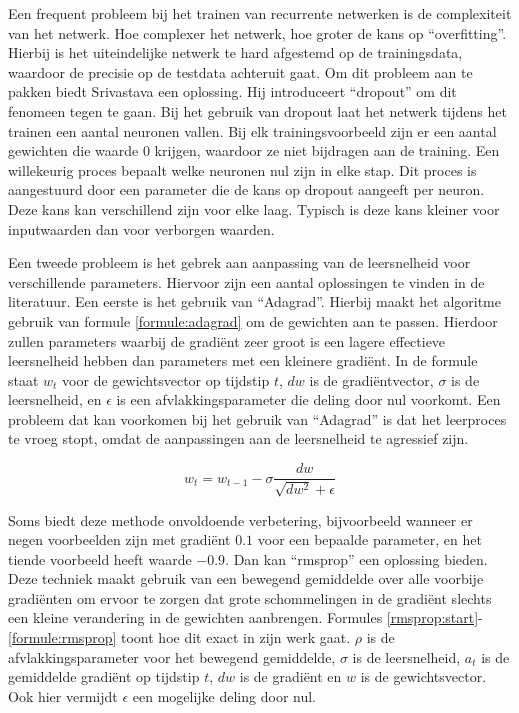 Een frequent probleem bij het trainen van recurrente netwerken is de complexiteit van het netwerk. Hoe complexer het netwerk, hoe groter de kans op ``overfitting''. Hierbij is het uiteindelijke netwerk te hard afgestemd op de trainingsdata, waardoor de precisie op de testdata achteruit gaat. Om dit probleem aan te pakken biedt Srivastava\cite{Srivastava2013} een oplossing. Hij introduceert ``dropout'' om dit fenomeen tegen te gaan. Bij het gebruik van dropout laat het netwerk tijdens het trainen een aantal neuronen vallen. Bij elk trainingsvoorbeeld zijn er een aantal gewichten die waarde 0 krijgen, waardoor ze niet bijdragen aan de training. Een willekeurig proces bepaalt welke neuronen nul zijn in elke stap. Dit proces is aangestuurd door een parameter die de kans op dropout aangeeft per neuron. Deze  kans kan verschillend zijn voor elke laag. Typisch is deze kans kleiner voor inputwaarden dan voor verborgen waarden.

Een tweede probleem is het gebrek aan aanpassing van de leersnelheid voor verschillende parameters. Hiervoor zijn een aantal oplossingen te vinden in de literatuur. Een eerste is het gebruik van ``Adagrad''\cite{Duchi2011}. Hierbij maakt het algoritme gebruik van formule \eqref{formule:adagrad} om de gewichten aan te passen. Hierdoor zullen parameters waarbij de gradi\"ent zeer groot is een lagere effectieve leersnelheid hebben dan parameters met een kleinere gradi\"ent. In de formule staat $w_t$ voor de gewichtsvector op tijdstip $t$, $dw$ is de gradi\"entvector, $\sigma$ is de leersnelheid, en $\epsilon$ is een afvlakkingsparameter die deling door nul voorkomt. Een probleem dat kan voorkomen bij het gebruik van ``Adagrad'' is dat het leerproces te vroeg stopt, omdat de aanpassingen aan de leersnelheid te agressief zijn.
 
\begin{equation}
    w_t = w_{t-1} - \sigma \frac{dw}{\sqrt{dw^2} + \epsilon}
    \label{formule:adagrad}
\end{equation}

Soms biedt deze methode onvoldoende verbetering, bijvoorbeeld wanneer er negen voorbeelden zijn met gradi\"ent $0.1$ voor een bepaalde parameter, en het tiende voorbeeld heeft waarde $-0.9$. Dan kan ``rmsprop''\cite{RMSprop} een oplossing bieden. Deze techniek maakt gebruik van een bewegend gemiddelde over alle voorbije gradi\"enten om ervoor te zorgen dat grote schommelingen in de gradi\"ent slechts een kleine verandering in de gewichten aanbrengen. Formules \eqref{rmsprop:start}-\eqref{formule:rmsprop} toont hoe dit exact in zijn werk gaat. $\rho$ is de afvlakkingsparameter voor het bewegend gemiddelde, $\sigma$ is de leersnelheid, $a_t$ is de gemiddelde gradi\"ent op tijdstip $t$, $dw$ is de gradi\"ent en $w$ is de gewichtsvector. Ook hier vermijdt $\epsilon$ een mogelijke deling door nul.

